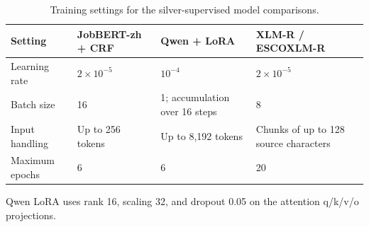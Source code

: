 \documentclass[fleqn,12pt]{wlpeerj}
\begin{document}
\setcounter{table}{5}
\begin{table}[!htbp]
\centering\small
\caption{Training settings for the silver-supervised model comparisons.}
\label{tab:training-settings}
\setlength{\tabcolsep}{4pt}
\begin{tabularx}{\linewidth}{@{}P{.22\linewidth}P{.20\linewidth}P{.27\linewidth}L@{}}
\toprule
Setting & JobBERT-zh + CRF & Qwen + LoRA & XLM-R / ESCOXLM-R \\
\midrule
Learning rate & $2\times10^{-5}$ & $10^{-4}$ & $2\times10^{-5}$ \\
Batch size & 16 & 1; accumulation over 16 steps & 8 \\
Input handling & Up to 256 tokens & Up to 8,192 tokens & Chunks of up to 128 source characters \\
Maximum epochs & 6 & 6 & 20 \\
\bottomrule
\end{tabularx}
\par\smallskip
{\footnotesize\RaggedRight Qwen LoRA uses rank 16, scaling 32, and dropout 0.05 on the attention q/k/v/o projections.\par}
\end{table}

\end{document}
